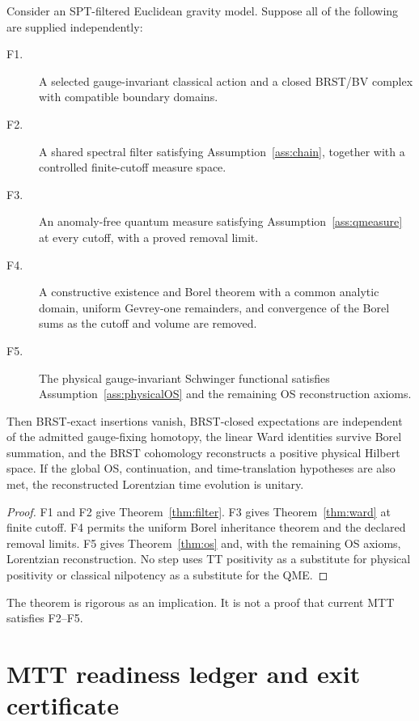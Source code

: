 \documentclass[11pt]{article}
\begin{document}
\begin{theorem}\label{thm:main}
Consider an SPT-filtered Euclidean gravity model.  Suppose all of the following
are supplied independently:
\begin{description}
\item[F1.] A selected gauge-invariant classical action and a closed BRST/BV
complex with compatible boundary domains.
\item[F2.] A shared spectral filter satisfying
Assumption~\ref{ass:chain}, together with a controlled finite-cutoff measure
space.
\item[F3.] An anomaly-free quantum measure satisfying
Assumption~\ref{ass:qmeasure} at every cutoff, with a proved removal limit.
\item[F4.] A constructive existence and Borel theorem with a common analytic
domain, uniform Gevrey-one remainders, and convergence of the Borel sums as the
cutoff and volume are removed.
\item[F5.] The physical gauge-invariant Schwinger functional satisfies
Assumption~\ref{ass:physicalOS} and the remaining OS reconstruction axioms.
\end{description}
Then BRST-exact insertions vanish, BRST-closed expectations are independent of
the admitted gauge-fixing homotopy, the linear Ward identities survive Borel
summation, and the BRST cohomology reconstructs a positive physical Hilbert
space.  If the global OS, continuation, and time-translation hypotheses are
also met, the reconstructed Lorentzian time evolution is unitary.
\end{theorem}

\begin{proof}
F1 and F2 give Theorem~\ref{thm:filter}.  F3 gives
Theorem~\ref{thm:ward} at finite cutoff.  F4 permits the uniform Borel
inheritance theorem and the declared removal limits.  F5 gives
Theorem~\ref{thm:os} and, with the remaining OS axioms, Lorentzian
reconstruction.  No step uses TT positivity as a substitute for physical
positivity or classical nilpotency as a substitute for the QME.
\end{proof}

The theorem is rigorous as an implication.  It is not a proof that current MTT
satisfies F2--F5.

\section{MTT readiness ledger and exit certificate}
\end{document}
